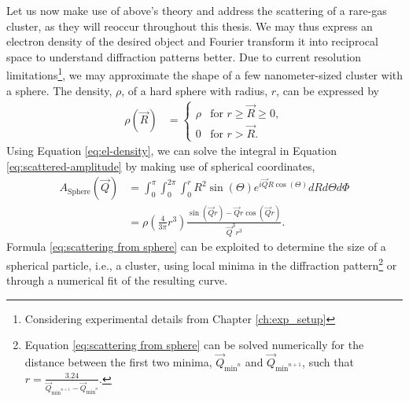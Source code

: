 %
Let us now make use of above's theory and address the scattering of a rare-gas cluster, as they will reoccur throughout this thesis. We may thus express an electron density of the desired object and Fourier transform it into reciprocal space to understand diffraction patterns better. Due to current resolution limitations\footnote{Considering experimental details from Chapter \ref{ch:exp_setup}}, we may approximate the shape of a few nanometer-sized cluster with a sphere. The density, $\rho$, of a hard sphere with radius, $r$, can be expressed by 
\begin{align}
\rho\left(\vec{R}\right)&=\begin{cases}
\rho& \text{for $r \geq \vec{R} \geq 0$},\\
0&\text{for $r > \vec{R}$}.
\end{cases}
\label{eq:el-density}
\end{align}
Using Equation \eqref{eq:el-density}, we can solve the integral in Equation \eqref{eq:scattered-amplitude} by making use of spherical coordinates,
\begin{align}
A_{\text{Sphere}}\left(\vec{Q}\right) &= \int_{0}^{\pi}\int_{0}^{2\pi}\int_{0}^{r} R^{2}  \sin\left(\Theta\right) e^{i \vec{Q} R \cos\left(\Theta\right)} dR d\Theta d\Phi\\
&=\rho\left(\frac{4}{3\pi}r^{3}\right)\frac{\sin\left(\vec{Q} r\right)-\vec{Q} r\cos\left(\vec{Q} r\right)}{\vec{Q}^{3} r^{3}}.
\label{eq:scattering from sphere}
\end{align}
Formula \eqref{eq:scattering from sphere} can be exploited to determine the size of a spherical particle, i.e., a cluster, using local minima in the diffraction pattern\footnote{Equation \eqref{eq:scattering from sphere} can be solved numerically for the distance between the first two minima, $\vec{Q}_{\text{min}^{n}}$ and $\vec{Q}_{\text{min}^{n+1}}$, such that $r=\frac{3.24}{\vec{Q}_{\text{min}^{n+1}}-\vec{Q}_{\text{min}^{n}}}$.} or through a numerical fit of the resulting curve.
%
%
%
%
%
%
